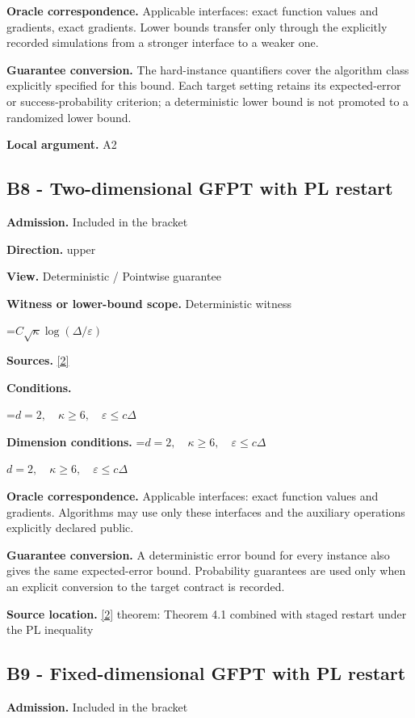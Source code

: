 \documentclass[10pt,a4paper]{article}
\newcommand{\AtlasMath}[1]{\par\begingroup\centering\setbox0=\hbox{$\displaystyle #1$}\ifdim\wd0>1.4\linewidth\typeout{ATLAS WIDE FORMULA: \the\wd0}\fi\ifdim\wd0>\linewidth\resizebox{\linewidth}{!}{\box0}\else\box0\fi\par\endgroup}
\newcommand{\AtlasInlineMath}[1]{\begingroup\setbox0=\hbox{$#1$}\ifdim\wd0>.4\linewidth\endgroup\AtlasMath{#1}\else\endgroup$#1$\fi}
\begin{document}
\textbf{Oracle correspondence.} Applicable interfaces: exact function values and gradients, exact gradients. Lower bounds transfer only through the explicitly recorded simulations from a stronger interface to a weaker one.

\textbf{Guarantee conversion.} The hard-instance quantifiers cover the algorithm class explicitly specified for this bound. Each target setting retains its expected-error or success-probability criterion; a deterministic lower bound is not promoted to a randomized lower bound.

\textbf{Local argument.} A2

\subsection{B8 - Two-dimensional GFPT with PL restart}
\textbf{Admission.} Included in the bracket

\textbf{Direction.} upper

\textbf{View.} Deterministic / Pointwise guarantee

\textbf{Witness or lower-bound scope.} Deterministic witness

\AtlasMath{C\sqrt\kappa\log(\Delta/\varepsilon)}
\textbf{Sources.} \href{https://arxiv.org/pdf/2310.09157}{[2]}

\textbf{Conditions.} 
\AtlasMath{d=2,\quad\kappa\ge6,\quad\varepsilon\le c\Delta}


\textbf{Dimension conditions.} \AtlasInlineMath{d=2,\quad\kappa\ge6,\quad\varepsilon\le c\Delta}

\textbf{Oracle correspondence.} Applicable interfaces: exact function values and gradients. Algorithms may use only these interfaces and the auxiliary operations explicitly declared public.

\textbf{Guarantee conversion.} A deterministic error bound for every instance also gives the same expected-error bound. Probability guarantees are used only when an explicit conversion to the target contract is recorded.

\textbf{Source location.} \href{https://arxiv.org/pdf/2310.09157}{[2]} theorem: Theorem 4.1 combined with staged restart under the PL inequality

\subsection{B9 - Fixed-dimensional GFPT with PL restart}
\textbf{Admission.} Included in the bracket
\end{document}
